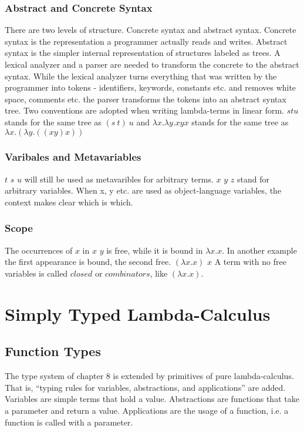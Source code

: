 \documentclass[acmlarge]{acmart}
\begin{document}
\subsubsection{Abstract and Concrete Syntax}
There are two levels of structure. Concrete syntax and abstract syntax. Concrete syntax is the representation a programmer actually reads and writes. Abstract syntax is the simpler internal representation of structures labeled as trees.
A lexical analyzer and a parser are needed to transform the concrete to the abstract syntax.
While the lexical analyzer turns everything that was written by the programmer into tokens - identifiers, keywords, constants etc. and removes white space, comments etc. the parser transforms the tokens into an abstract syntax tree.
Two conventions are adopted when writing lambda-terms in linear form. $s t u$ stands for the same tree as $(s\ t)\ u$
and $\lambda x. \lambda y. x y x$ stands for the same tree as $\lambda x. (\lambda y. ((x y) x))$

\subsubsection{Varibales and Metavariables}
$t$ $s$ $u$ will still be used as metavaribles for arbitrary terms. $x$ $y$ $z$ stand for arbitrary variables. When x, y etc. are used as object-language variables, the context makes clear which is which.

\subsubsection{Scope}
The occurrences of $x$ in $x$ $y$ is free, while it is bound in $\lambda x.x$.
In another example the first appearance is bound, the second free. $(\lambda x.x)$ $x$
A term with no free variables is called $closed$ or $combinators$, like $(\lambda x.x)$.



\section{Simply Typed Lambda-Calculus}

\subsection{Function Types}

The type system of chapter 8 is extended by primitives of pure lambda-calculus. That is, ``typing rules for variables, abstractions, and applications'' are added. Variables are simple terms that hold a value. Abstractions are functions that take a parameter and return a value. Applications are the usage of a function, i.e. a function is called with a parameter.
\end{document}
